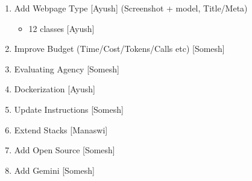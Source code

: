\begin{enumerate}
\begin{enumerate}
        \item What is Average LCP time vs INP/CLS [Arnav]? --> Use hybrid Network Simulation (initially fast, then make it slow)
        \item Check CWV implementation with AEM [Somesh]
        \item What is the effect of reducing number of runs
        \begin{itemize}
            \item Try on github live compare to EDS to check if major variance is due to network 
        \item Get current implementation reviewed
        \end{itemize}
    \end{enumerate}
    \item Add Webpage Type [Ayush] (Screenshot + model, Title/Meta)
    \begin{itemize}
        \item 12 classes [Ayush]
    \end{itemize}
    \item Improve Budget (Time/Cost/Tokens/Calls etc)  [Somesh]
    \item Evaluating Agency [Somesh]
    \item Dockerization [Ayush]
    \item Update Instructions [Somesh]
    \item Extend Stacks [Manaswi]
    \item Add Open Source [Somesh]
    \item Add Gemini [Somesh]
\end{enumerate}

